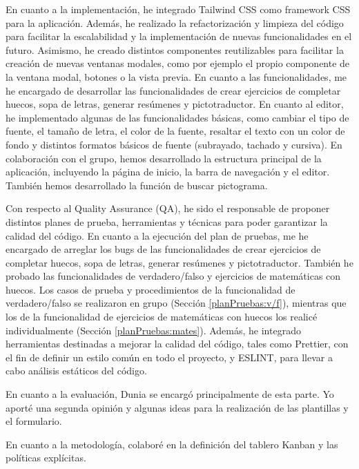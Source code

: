 En cuanto a la implementación, he integrado Tailwind CSS como framework CSS para la aplicación. Además, he realizado la refactorización y limpieza del código para facilitar la escalabilidad y la implementación de nuevas funcionalidades en el futuro. Asimismo, he creado distintos componentes reutilizables para facilitar la creación de nuevas ventanas modales, como por ejemplo el propio componente de la ventana modal, botones o la vista previa. En cuanto a las funcionalidades, me he encargado de desarrollar las funcionalidades de crear ejercicios de completar huecos, sopa de letras, generar resúmenes y pictotraductor. En cuanto al editor, he implementado algunas de las funcionalidades básicas, como cambiar el tipo de fuente, el tamaño de letra, el color de la fuente, resaltar el texto con un color de fondo y distintos formatos básicos de fuente (subrayado, tachado y cursiva). En colaboración con el grupo, hemos desarrollado la estructura principal de la aplicación, incluyendo la página de inicio, la barra de navegación y el editor. También hemos desarrollado la función de buscar pictograma.

Con respecto al Quality Assurance (QA), he sido el responsable de proponer distintos planes de prueba, herramientas y técnicas para poder garantizar la calidad del código. En cuanto a la ejecución del plan de pruebas, me he encargado de arreglar los bugs de las funcionalidades de crear ejercicios de completar huecos, sopa de letras, generar resúmenes y pictotraductor. También he probado las funcionalidades de verdadero/falso y ejercicios de matemáticas con huecos. Los casos de prueba y procedimientos de la funcionalidad de verdadero/falso se realizaron en grupo (Sección \ref{planPruebas:v/f}), mientras que los de la funcionalidad de ejercicios de matemáticas con huecos los realicé individualmente (Sección \ref{planPruebas:mates}). Además, he integrado herramientas destinadas a mejorar la calidad del código, tales como Prettier, con el fin de definir un estilo común en todo el proyecto, y ESLINT, para llevar a cabo análisis estáticos del código.

En cuanto a la evaluación, Dunia se encargó principalmente de esta parte. Yo aporté una segunda opinión y algunas ideas para la realización de las plantillas y el formulario.

En cuanto a la metodología, colaboré en la definición del tablero Kanban y las políticas explícitas.

